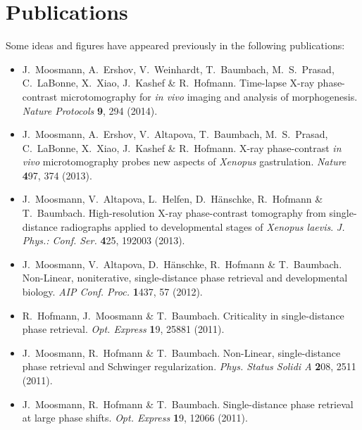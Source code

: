 \documentclass[
twoside,
openright,
titlepage,
numbers=noenddot,
headinclude,
fleqn,
a4paper,
footinclude=true,
cleardoublepage=empty,
abstractoff,
BCOR=5mm,
paper=a4,
fontsize=11pt,
british,ngerman,american,
]{scrreprt}
\begin{document}
\endgroup			
\vfill
\cleardoublepage

\chapter*{Publications}
Some ideas and figures have appeared previously in the following
publications:
\begin{itemize}[leftmargin=*]

\item[] J.~Moosmann, A.~Ershov, V.~Weinhardt, T.~Baumbach,
  M.~S.~Prasad, C.~LaBonne, X.~Xiao, J.~Kashef \&
  R.~Hofmann. Time-lapse X-ray phase-contrast microtomography for
  \emph{in vivo} imaging and analysis of morphogenesis. \emph{Nature
    Protocols} {\textbf 9}, 294 (2014).

\item[] J.~Moosmann, A.~Ershov, V.~Altapova, T.~Baumbach,
  M.~S.~Prasad, C.~LaBonne, X.~Xiao, J.~Kashef \& R.~Hofmann. X-ray
  phase-contrast \emph{in vivo} microtomography probes new aspects of
  \emph{Xenopus} gastrulation. \emph{Nature} {\textbf 497}, 374 (2013).

\item[] J.~Moosmann, V.~Altapova, L.~Helfen, D.~Hänschke,
  R.~Hofmann \& T.~Baumbach. High-resolution X-ray phase-contrast
  tomography from single-distance radiographs applied to developmental
  stages of \emph{Xenopus laevis}. \emph{J. Phys.: Conf. Ser.} {\textbf
    425}, 192003 (2013).

\item[] J.~Moosmann, V.~Altapova, D.~Hänschke, R.~Hofmann \&
  T.~Baumbach.  Non-Linear, noniterative, single-distance phase
  retrieval and developmental biology. \emph{AIP Conf. Proc.} {\textbf
    1437}, 57 (2012).

\item[] R.~Hofmann, J.~Moosmann \& T.~Baumbach. Criticality in
  single-distance phase retrieval. \emph{Opt. Express} {\textbf 19}, 25881
  (2011).

\item[] J.~Moosmann, R.~Hofmann \& T.~Baumbach. Non-Linear,
  single-distance phase retrieval and Schwinger regularization.
  \emph{Phys. Status Solidi A} {\textbf 208}, 2511 (2011).

\item[] J.~Moosmann, R.~Hofmann \& T.~Baumbach. Single-distance phase
  retrieval at large phase shifts. \emph{Opt. Express} {\textbf 19}, 12066
  (2011).


\end{itemize}
\end{document}
